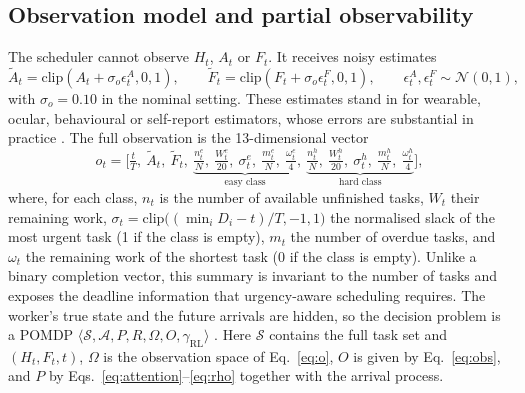 \subsection{Observation model and partial observability}
The scheduler cannot observe $H_t$, $A_t$ or $F_t$. It receives noisy estimates
\begin{equation}
\tilde A_t=\mathrm{clip}(A_t+\sigma_o\epsilon^A_t,0,1),\qquad \tilde F_t=\mathrm{clip}(F_t+\sigma_o\epsilon^F_t,0,1),\qquad \epsilon^{A}_t,\epsilon^{F}_t\sim\mathcal N(0,1),
\label{eq:obs}
\end{equation}
with $\sigma_o=0.10$ in the nominal setting. These estimates stand in for wearable, ocular, behavioural or self-report estimators, whose errors are substantial in practice \cite{charles2019,borghini2014,hogervorst2014}. The full observation is the 13-dimensional vector
\begin{equation}
o_t=\Big[\tfrac{t}{T},\ \tilde A_t,\ \tilde F_t,\ \underbrace{\tfrac{n^e_t}{N},\ \tfrac{W^e_t}{20},\ \sigma^e_t,\ \tfrac{m^e_t}{N},\ \tfrac{\omega^e_t}{4}}_{\text{easy class}},\ \underbrace{\tfrac{n^h_t}{N},\ \tfrac{W^h_t}{20},\ \sigma^h_t,\ \tfrac{m^h_t}{N},\ \tfrac{\omega^h_t}{4}}_{\text{hard class}}\Big],
\label{eq:o}
\end{equation}
where, for each class, $n_t$ is the number of available unfinished tasks, $W_t$ their remaining work, $\sigma_t=\mathrm{clip}\big((\min_i D_i-t)/T,-1,1\big)$ the normalised slack of the most urgent task (1 if the class is empty), $m_t$ the number of overdue tasks, and $\omega_t$ the remaining work of the shortest task (0 if the class is empty). Unlike a binary completion vector, this summary is invariant to the number of tasks and exposes the deadline information that urgency-aware scheduling requires. The worker's true state and the future arrivals are hidden, so the decision problem is a POMDP $\langle\mathcal S,\mathcal A,P,R,\Omega,O,\gamma_{\mathrm{RL}}\rangle$ \cite{kaelbling1998}. Here $\mathcal S$ contains the full task set and $(H_t,F_t,t)$, $\Omega$ is the observation space of Eq.~\eqref{eq:o}, $O$ is given by Eq.~\eqref{eq:obs}, and $P$ by Eqs.~\eqref{eq:attention}--\eqref{eq:rho} together with the arrival process.

